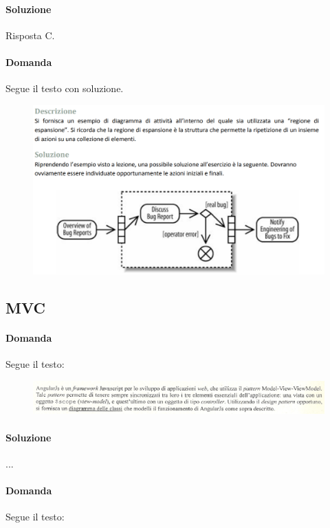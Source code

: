 \paragraph{Soluzione} Risposta C.

\paragraph{Domanda} Segue il testo con soluzione.

\begin{figure}[H]\center
\includegraphics[width=1\textwidth]{res/img/Esercizi/es-diagrammaAttivita2}
\end{figure}

\subsection{MVC}

\paragraph{Domanda} Segue il testo:

\begin{figure}[H]\center
\includegraphics[width=1\textwidth]{res/img/Esercizi/es-angular}
\end{figure}

\paragraph{Soluzione} ...

\paragraph{Domanda} Segue il testo:


